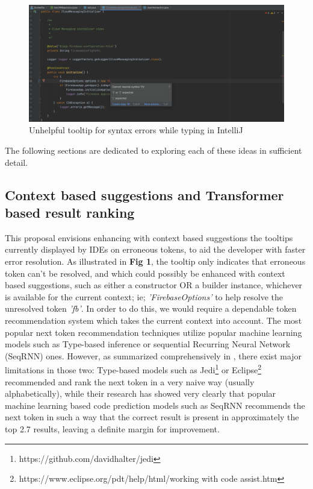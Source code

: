 \documentclass[sigplan,screen,9pt]{acmart}
\begin{document}
\begin{figure}[h]
  \centering
  \includegraphics[width=\linewidth]{figs/token_unresolved.png}
  \caption{Unhelpful tooltip for syntax errors while typing in IntelliJ}
\end{figure}
The following sections are dedicated to exploring each of these ideas in sufficient detail.

\subsection{Context based suggestions and Transformer based result ranking}
This proposal envisions enhancing with context based suggestions the tooltips currently displayed by IDEs on erroneous tokens, to aid the developer with faster error resolution. As illustrated in \textbf{Fig 1}, the tooltip only indicates that erroneous token can't be resolved, and which could possibly be enhanced with context based suggestions, such as either a constructor OR a builder instance, whichever is available for the current context; ie; \textit{'FirebaseOptions'} to help resolve the unresolved token \textit{'fb'}.
\newline
In order to do this, we would require a dependable token recommendation system which takes the current context into account. The most popular next token recommendation techniques utilize popular machine learning models such as Type-based inference or sequential Recurring Neural Network (SeqRNN) ones. However, as summarized comprehensively in \cite{FeedTree}, there exist major limitations in those two: Type-based models such as Jedi\footnote{https://github.com/davidhalter/jedi} or Eclipse\footnote{https://www.eclipse.org/pdt/help/html/working with code assist.htm} recommended and rank the next token in a very naive way (usually alphabetically), while their research has showed very clearly that popular machine learning based code prediction models such as SeqRNN recommends the next token in such a way that the correct result is present in approximately the top 2.7 results, leaving a definite margin for improvement.\cite{FeedTree}
\end{document}
